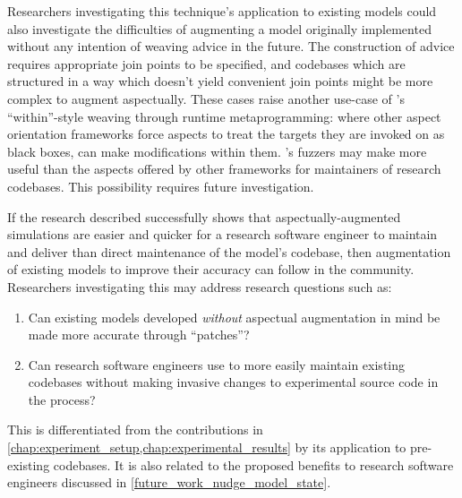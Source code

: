 Researchers investigating this technique's application to existing models could
also investigate the difficulties of augmenting a model originally implemented
without any intention of weaving advice in the future. The construction of
advice requires appropriate join points to be specified, and codebases which are
structured in a way which doesn't yield convenient join points might be more
complex to augment aspectually. These cases raise another use-case of \pdsfthree{}'s
``within''-style weaving through runtime metaprogramming: where other aspect
orientation frameworks force aspects to treat the targets they are invoked on as
black boxes, \pdsfthree can make modifications within them. \pdsfthree{}'s fuzzers may
make \aop{} more useful than the aspects offered by other frameworks for
maintainers of research codebases. This possibility requires future
investigation.

If the research described successfully shows that aspectually-augmented
simulations are easier and quicker for a research software engineer to maintain
and deliver than direct maintenance of the model's codebase, then augmentation
of existing models to improve their accuracy can follow in the community.
Researchers investigating this may address research questions such as:

\begin{researchquestion}
    \begin{enumerate}
\item Can existing models developed \emph{without} aspectual augmentation in
mind be made more accurate through \aspectoriented{} ``patches''?
\item Can research software engineers use \aop{} to more easily maintain
existing codebases without making invasive changes to experimental source code
in the process?
    \end{enumerate}
\end{researchquestion}

This is differentiated from the contributions in \cref{chap:experiment_setup,chap:experimental_results}
by its application to pre-existing
codebases. It is also related to the proposed benefits to research software
engineers discussed in \cref{future_work_nudge_model_state}.
    


